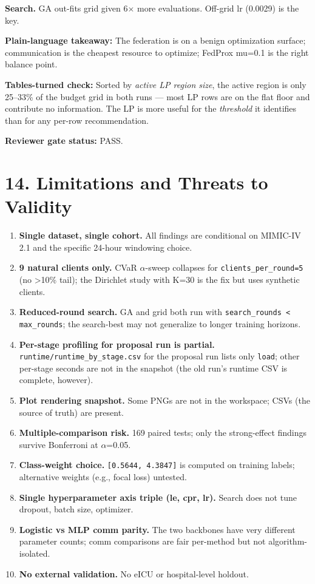 \documentclass{article}
\begin{document}
\textbf{Search.} GA out-fits grid given 6\ensuremath{\times} more evaluations. Off-grid lr (0.0029) is the key.


\textbf{Plain-language takeaway:} The federation is on a benign optimization surface; communication is the cheapest resource to optimize; FedProx mu=0.1 is the right balance point.


\textbf{Tables-turned check:} Sorted by \emph{active LP region size}, the active region is only 25--33\% of the budget grid in both runs --- most LP rows are on the flat floor and contribute no information. The LP is more useful for the \emph{threshold} it identifies than for any per-row recommendation.


\textbf{Reviewer gate status:} PASS.



\clearpage
\section{14. Limitations and Threats to Validity}


\begin{enumerate}[leftmargin=1.4em,itemsep=2pt,topsep=2pt]
  \item \textbf{Single dataset, single cohort.} All findings are conditional on MIMIC-IV 2.1 and the specific 24-hour windowing choice.
  \item \textbf{9 natural clients only.} CVaR \ensuremath{\alpha}-sweep collapses for \texttt{clients\_per\_round=5} (no >10\% tail); the Dirichlet study with K=30 is the fix but uses synthetic clients.
  \item \textbf{Reduced-round search.} GA and grid both run with \texttt{search\_rounds < max\_rounds}; the search-best may not generalize to longer training horizons.
  \item \textbf{Per-stage profiling for proposal run is partial.} \texttt{runtime/runtime\_by\_stage.csv} for the proposal run lists only \texttt{load}; other per-stage seconds are not in the snapshot (the old run's runtime CSV is complete, however).
  \item \textbf{Plot rendering snapshot.} Some PNGs are not in the workspace; CSVs (the source of truth) are present.
  \item \textbf{Multiple-comparison risk.} 169 paired tests; only the strong-effect findings survive Bonferroni at \ensuremath{\alpha}=0.05.
  \item \textbf{Class-weight choice.} \texttt{[0.5644, 4.3847]} is computed on training labels; alternative weights (e.g., focal loss) untested.
  \item \textbf{Single hyperparameter axis triple (le, cpr, lr).} Search does not tune dropout, batch size, optimizer.
  \item \textbf{Logistic vs MLP comm parity.} The two backbones have very different parameter counts; comm comparisons are fair per-method but not algorithm-isolated.
  \item \textbf{No external validation.} No eICU or hospital-level holdout.
\end{enumerate}
\end{document}
